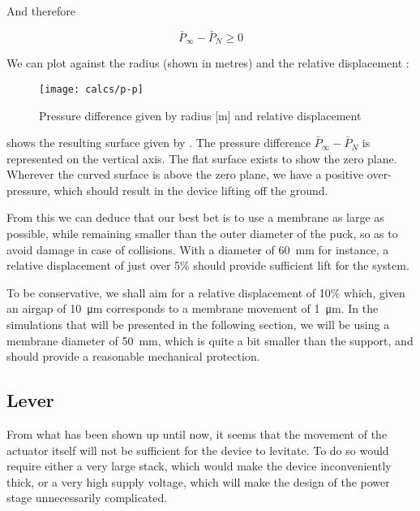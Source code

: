And therefore

\begin{equation}
  \bar{P}_\infty - \bar{P}_N \geq 0
  \label{eq:pinfty0}
\end{equation}

We can plot  against the radius (shown in metres) and the
relative displacement :

\begin{figure}[h]
  \begin{center}
    \texttt{[image: calcs/p-p]}
  \end{center}
  \caption{Pressure difference given by radius [m] and relative displacement}
  \label{fig:p-p}
\end{figure}

 shows the resulting surface given by . The pressure
difference $\bar{P}_\infty - \bar{P}_N$ is represented on the vertical axis. The
flat surface exists to show the zero plane. Wherever the curved surface is above
the zero plane, we have a positive over-pressure, which should result in the
device lifting off the ground.

From this we can deduce that our best bet is to use a membrane as large as
possible, while remaining smaller than the outer diameter of the puck, so as to
avoid damage in case of collisions. With a diameter of \SI{60}{\milli\metre} for
instance, a relative displacement of just over 5\% should provide sufficient
lift for the system.

To be conservative, we shall aim for a relative displacement of 10\% which,
given an airgap of \SI{10}{\micro\metre} corresponds to a membrane movement of
\SI{1}{\micro\metre}. In the simulations that will be presented in the following
section, we will be using a membrane diameter of \SI{50}{\milli\metre}, which is
quite a bit smaller than the support, and should provide a reasonable mechanical
protection.

\subsection{Lever}
\label{sub:lever}

From what has been shown up until now, it seems that the movement of the
actuator itself will not be sufficient for the device to levitate. To do so
would require either a very large stack, which would make the device
inconveniently thick, or a very high supply voltage, which will make the design
of the power stage unnecessarily complicated.

